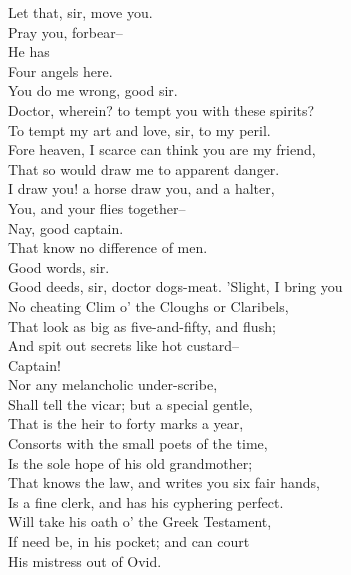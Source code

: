 \documentclass{memoir}
\begin{document}
\begin{drama*}
 Let that, sir, move you.\\
\subtlespeaks {} Pray you, forbear--\\
\facespeaks  He has\\
 Four angels here.\\
\subtlespeaks {} You do me wrong, good sir.\\
\facespeaks  Doctor, wherein? to tempt you with these spirits?\\
\subtlespeaks  To tempt my art and love, sir, to my peril.\\
 Fore heaven, I scarce can think you are my friend,\\
 That so would draw me to apparent danger.\\
\facespeaks  I draw you! a horse draw you, and a halter,\\
 You, and your flies together--\\
\dapperspeaks {} Nay, good captain.\\
\facespeaks  That know no difference of men.\\
\subtlespeaks {} Good words, sir.\\
\facespeaks  Good deeds, sir, doctor dogs-meat. 'Slight, I bring you\\
 No cheating Clim o' the Cloughs or Claribels,\\
 That look as big as five-and-fifty, and flush;\\
 And spit out secrets like hot custard--\\
\dapperspeaks {} Captain!\\
\facespeaks  Nor any melancholic under-scribe,\\
 Shall tell the vicar; but a special gentle,\\
 That is the heir to forty marks a year,\\
 Consorts with the small poets of the time,\\
 Is the sole hope of his old grandmother;\\
 That knows the law, and writes you six fair hands,\\
 Is a fine clerk, and has his cyphering perfect.\\
 Will take his oath o' the Greek Testament,\\
 If need be, in his pocket; and can court\\
 His mistress out of Ovid.\\

\end{drama*}
\end{document}

